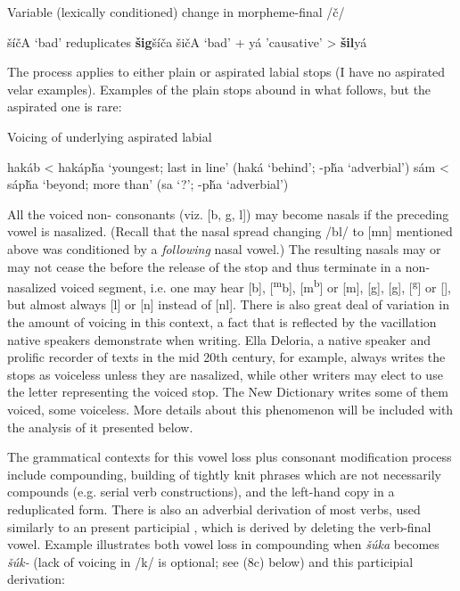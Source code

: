 \documentclass[output=paper]{LSP/langsci}
\begin{document}
\begin{exe}
\ex\label{ex:rood:5}
Variable (lexically conditioned) change in morpheme-final /\v{c}/
\begin{xlist}
\ex \v{s}\'i\v{c}A `bad' reduplicates \textbf{\v{s}ig}\v{s}\'i\v{c}a
\ex \v{s}i\v{c}A `bad' + y\'a 'causative' > \textbf{\v{s}il}y\'a
\end{xlist}
\end{exe}

The process applies to either plain or aspirated labial stops (I have no aspirated velar examples). Examples of the plain stops abound in what follows, but the aspirated one is rare:

\begin{exe}
\ex \label{ex:rood:6}
Voicing of underlying aspirated labial
\begin{xlist}
\ex hak\'ab < hak\'ap\v{h}a `youngest; last in line' (hak\'a `behind'; -p\v{h}a `adverbial')
\ex s\'am < s\'ap\v{h}a `beyond; more than' (sa `?'; -p\v{h}a `adverbial')
\end{xlist}
\end{exe}

All the voiced non- consonants (viz. [b, g, l]) may become nasals if the preceding vowel is nasalized. (Recall that the nasal spread changing /bl/ to [mn] mentioned above was conditioned by a \textit{following} nasal vowel.) The resulting nasals may or may not cease the  before the release of the stop and thus terminate in a non-nasalized voiced segment, i.e. one may hear [b], [\textsuperscript{m}b], [m\textsuperscript{b}] or [m], [g], [\textsuperscript{}g], [\textsuperscript{g}] or [], but almost always [l] or [n] instead of [nl]. There is also great deal of variation in the amount of voicing in this context, a fact that is reflected by the vacillation native speakers demonstrate when writing. Ella Deloria, a native speaker and prolific recorder of  texts in the mid 20th century, for example, always writes the stops as voiceless unless they are nasalized, while other writers may elect to use the letter representing the voiced stop. The New  Dictionary writes some of them voiced, some voiceless. More details about this phenomenon will be included with the analysis of it presented below.

The grammatical contexts for this vowel loss plus consonant modification process include compounding, building of tightly knit phrases which are not necessarily compounds (e.g. serial verb constructions), and the left-hand copy in a reduplicated form. There is also an adverbial derivation of most verbs, used similarly to an  present participial , which is derived by deleting the verb-final vowel. Example  illustrates both vowel loss in compounding when \textit{\v{s}\'uka} becomes \textit{\v{s}\'uk-} (lack of voicing in /k/ is optional; see (8c) below) and this participial derivation:
\end{document}
